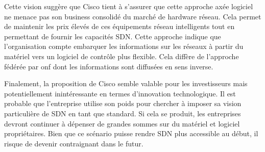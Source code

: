 Cette vision suggère que Cisco tient à s'assurer que cette approche axée logiciel ne menace pas son business consolidé du marché de hardware réseau. Cela permet de maintenir les prix élevés de ces équipements réseau intelligents tout en permettant de fournir les capacités SDN. Cette approche indique que l'organisation compte embarquer les informations sur les réseaux à partir du matériel vers un logiciel de contrôle plus flexible. Cela diffère de l'approche fédérée par \gls{onf} dont les informations sont diffusées en sens inverse. 



Finalement, la proposition de Cisco semble valable pour les investisseurs mais potentiellement inintéressante en termes d'innovation technologique. Il est probable que l'entreprise utilise son poids pour chercher à imposer sa vision particulière de SDN en tant que standard. Si cela se produit, les entreprises devront continuer à dépenser de grandes sommes sur du matériel et logiciel propriétaires. Bien que ce scénario puisse rendre SDN plus accessible au début, il risque de devenir contraignant dans le futur. \cite{ExecutiveGuideToSDNCisco}




